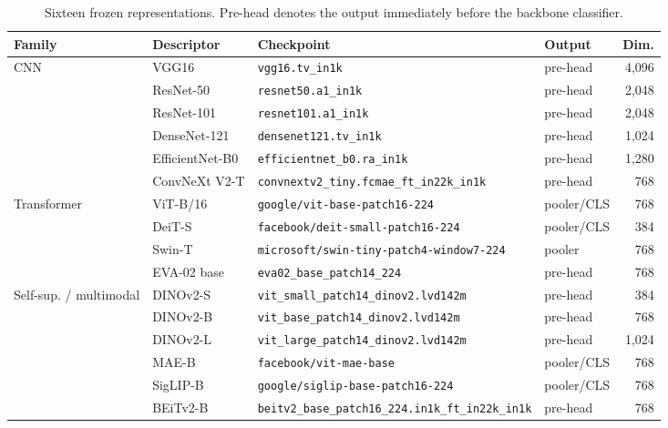 \documentclass[10pt,a4paper,fleqn]{article}
\begin{document}
\begin{table}[htbp]
\centering
\caption{Sixteen frozen representations. Pre-head denotes the output immediately before the backbone classifier.}
\label{tab:extractores-aprendidos}
\setlength{\tabcolsep}{4pt}
\begin{tabular}{@{}p{1.80cm}p{1.95cm}p{4.15cm}p{1.25cm}r@{}}
\toprule
Family & Descriptor & Checkpoint & Output & Dim. \\
\midrule
CNN & VGG16 & \nolinkurl{vgg16.tv_in1k} & pre-head & 4,096 \\
 & ResNet-50 & \nolinkurl{resnet50.a1_in1k} & pre-head & 2,048 \\
 & ResNet-101 & \nolinkurl{resnet101.a1_in1k} & pre-head & 2,048 \\
 & DenseNet-121 & \nolinkurl{densenet121.tv_in1k} & pre-head & 1,024 \\
 & EfficientNet-B0 & \nolinkurl{efficientnet_b0.ra_in1k} & pre-head & 1,280 \\
 & ConvNeXt V2-T & \nolinkurl{convnextv2_tiny.fcmae_ft_in22k_in1k} & pre-head & 768 \\
\midrule
Transformer & ViT-B/16 & \nolinkurl{google/vit-base-patch16-224} & pooler/\newline CLS & 768 \\
 & DeiT-S & \nolinkurl{facebook/deit-small-patch16-224} & pooler/\newline CLS & 384 \\
 & Swin-T & \nolinkurl{microsoft/swin-tiny-patch4-window7-224} & pooler & 768 \\
 & EVA-02 base & \nolinkurl{eva02_base_patch14_224} & pre-head & 768 \\
\midrule
Self-sup. / multimodal & DINOv2-S & \nolinkurl{vit_small_patch14_dinov2.lvd142m} & pre-head & 384 \\
 & DINOv2-B & \nolinkurl{vit_base_patch14_dinov2.lvd142m} & pre-head & 768 \\
 & DINOv2-L & \nolinkurl{vit_large_patch14_dinov2.lvd142m} & pre-head & 1,024 \\
 & MAE-B & \nolinkurl{facebook/vit-mae-base} & pooler/\newline CLS & 768 \\
 & SigLIP-B & \nolinkurl{google/siglip-base-patch16-224} & pooler/\newline CLS & 768 \\
 & BEiTv2-B & \nolinkurl{beitv2_base_patch16_224.in1k_ft_in22k_in1k} & pre-head & 768 \\
\bottomrule
\end{tabular}
\end{table}
\end{document}
